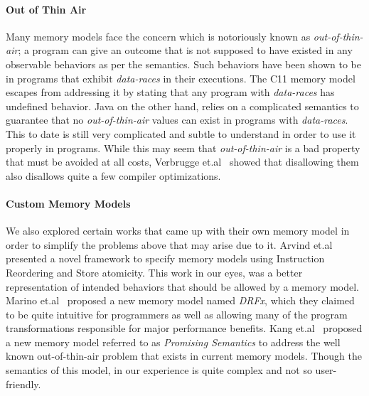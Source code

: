     \paragraph{Out of Thin Air }
    Many memory models face the concern which is notoriously known as \textit{out-of-thin-air}; a program can give an outcome that is not supposed to have existed in any observable behaviors as per the semantics. %
    Such behaviors have been shown to be in programs that exhibit \textit{data-races} in their executions.
    The C11 memory model \cite{C11MM} escapes from addressing it by stating that any program with \textit{data-races} has undefined behavior.
    Java on the other hand, relies on a complicated semantics to guarantee that no \textit{out-of-thin-air} values can exist in programs with \textit{data-races}. This to date is still very complicated and subtle to understand in order to use it properly in programs. 
    While this may seem that \textit{out-of-thin-air} is a bad property that must be avoided at all costs, Verbrugge et.al~\cite{Verbrugge} showed that disallowing them also disallows quite a few compiler optimizations.

    \paragraph{Custom Memory Models}
    We also explored certain works that came up with their own memory model in order to simplify the problems above that may arise due to it. 
    Arvind et.al~\cite{Arvind} presented a novel framework to specify memory models using Instruction Reordering and Store atomicity. This work in our eyes, was a better representation of intended behaviors that should be allowed by a memory model. 
    Marino et.al~\cite{Marino} proposed a new memory model named \textit{DRFx}, which they claimed to be quite intuitive for programmers as well as allowing many of the program transformations responsible for major performance benefits.
    Kang et.al~\cite{Kang} proposed a new memory model referred to as \textit{Promising Semantics} to address the well known out-of-thin-air problem that exists in current memory models. Though the semantics of this model, in our experience is quite complex and not so user-friendly.
